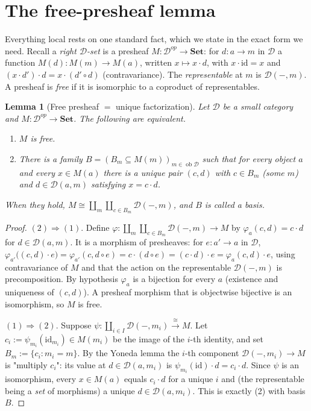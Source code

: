 \documentclass[11pt]{article}
\newtheorem{lemma}[theorem]{Lemma}
\theoremstyle{definition}
\newcommand{\id}{\mathrm{id}}
\newcommand{\D}{\mathcal{D}}
\newcommand{\Set}{\mathbf{Set}}
\newcommand{\ob}{\operatorname{ob}}
\begin{document}
\section{The free-presheaf lemma}

Everything local rests on one standard fact, which we state in the exact form we
need. Recall a \emph{right $\D$-set} is a presheaf $M:\D^{op}\to\Set$: for
$d:a\to m$ in $\D$ a function $M(d):M(m)\to M(a)$, written $x\mapsto x\cdot d$,
with $x\cdot\id=x$ and $(x\cdot d')\cdot d=x\cdot(d'\circ d)$ (contravariance).
The \emph{representable} at $m$ is $\D(-,m)$. A presheaf is \emph{free} if it is
isomorphic to a coproduct of representables.

\begin{lemma}[Free presheaf $=$ unique factorization]\label{lem:free}
Let $\D$ be a small category and $M:\D^{op}\to\Set$. The following are
equivalent.
\begin{enumerate}
\item $M$ is free.
\item There is a family $B=(B_m\subseteq M(m))_{m\in\ob\D}$ such that for every
object $a$ and every $x\in M(a)$ there is a \emph{unique} pair $(c,d)$ with
$c\in B_m$ (some $m$) and $d\in\D(a,m)$ satisfying $x=c\cdot d$.
\end{enumerate}
When they hold, $M\cong\coprod_{m}\coprod_{c\in B_m}\D(-,m)$, and $B$ is called a
\emph{basis}.
\end{lemma}

\begin{proof}
$(2)\Rightarrow(1)$. Define $\varphi:\coprod_{m}\coprod_{c\in B_m}\D(-,m)\to M$ by
$\varphi_a(c,d)=c\cdot d$ for $d\in\D(a,m)$. It is a morphism of presheaves: for
$e:a'\to a$ in $\D$, $\varphi_{a'}\big((c,d)\cdot e\big)=\varphi_{a'}(c,d\circ
e)=c\cdot(d\circ e)=(c\cdot d)\cdot e=\varphi_a(c,d)\cdot e$, using contravariance
of $M$ and that the action on the representable $\D(-,m)$ is precomposition. By
hypothesis $\varphi_a$ is a bijection for every $a$ (existence and uniqueness of
$(c,d)$). A presheaf morphism that is objectwise bijective is an isomorphism, so
$M$ is free.

$(1)\Rightarrow(2)$. Suppose $\psi:\coprod_{i\in I}\D(-,m_i)\xrightarrow{\ \cong\
}M$. Let $c_i:=\psi_{m_i}(\id_{m_i})\in M(m_i)$ be the image of the $i$-th
identity, and set $B_m:=\{c_i:m_i=m\}$. By the Yoneda lemma the $i$-th component
$\D(-,m_i)\to M$ is "multiply $c_i$": its value at $d\in\D(a,m_i)$ is
$\psi_{m_i}(\id)\cdot d=c_i\cdot d$. Since $\psi$ is an isomorphism, every
$x\in M(a)$ equals $c_i\cdot d$ for a unique $i$ and (the representable being a
\emph{set} of morphisms) a unique $d\in\D(a,m_i)$. This is exactly (2) with basis
$B$.
\end{proof}
\end{document}
